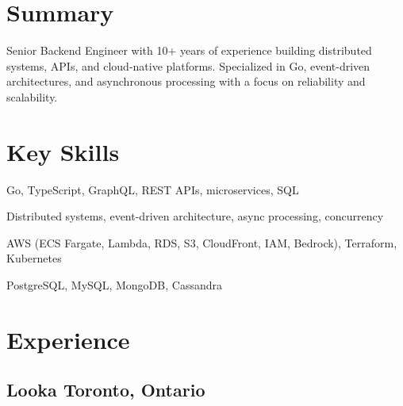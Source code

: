 \documentclass[10pt]{article}
\begin{document}


\section{Summary}
Senior Backend Engineer with 10+ years of experience building distributed systems, APIs, and cloud-native platforms. Specialized in Go, event-driven architectures, and asynchronous processing with a focus on reliability and scalability.

\section{Key Skills}
\begin{description}[itemsep=0pt]
  \item[Backend] Go, TypeScript, GraphQL, REST APIs, microservices, SQL
  \item[Systems] Distributed systems, event-driven architecture, async processing, concurrency
  \item[Infrastructure] AWS (ECS Fargate, Lambda, RDS, S3, CloudFront, IAM, Bedrock), Terraform, Kubernetes
  \item[Databases] PostgreSQL, MySQL, MongoDB, Cassandra
\end{description}

\section{Experience}

\subsection{Looka \hfill Toronto, Ontario}
\end{document}
